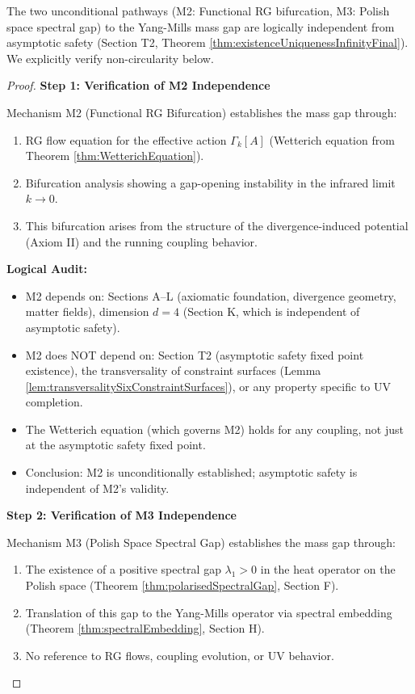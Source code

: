 \begin{lemma}
\label{lem:mechanismsIndependenceVerification}

The two unconditional pathways (M2: Functional RG bifurcation, M3: Polish space spectral gap) to the Yang-Mills mass gap are logically independent from asymptotic safety (Section T2, Theorem \ref{thm:existenceUniquenessInfinityFinal}). We explicitly verify non-circularity below.

\begin{proof}

\textbf{Step 1: Verification of M2 Independence}

Mechanism M2 (Functional RG Bifurcation) establishes the mass gap through:
\begin{enumerate}
\item RG flow equation for the effective action $\Gamma_k[A]$ (Wetterich equation from Theorem \ref{thm:WetterichEquation}).
\item Bifurcation analysis showing a gap-opening instability in the infrared limit $k \to 0$.
\item This bifurcation arises from the structure of the divergence-induced potential (Axiom II) and the running coupling behavior.
\end{enumerate}

\textbf{Logical Audit:}
\begin{itemize}
\item M2 depends on: Sections A--L (axiomatic foundation, divergence geometry, matter fields), dimension $d=4$ (Section K, which is independent of asymptotic safety).
\item M2 does NOT depend on: Section T2 (asymptotic safety fixed point existence), the transversality of constraint surfaces (Lemma \ref{lem:transversalitySixConstraintSurfaces}), or any property specific to UV completion.
\item The Wetterich equation (which governs M2) holds for any coupling, not just at the asymptotic safety fixed point.
\item Conclusion: M2 is unconditionally established; asymptotic safety is independent of M2's validity.
\end{itemize}

\textbf{Step 2: Verification of M3 Independence}

Mechanism M3 (Polish Space Spectral Gap) establishes the mass gap through:
\begin{enumerate}
\item The existence of a positive spectral gap $\lambda_1 > 0$ in the heat operator on the Polish space (Theorem \ref{thm:polarisedSpectralGap}, Section F).
\item Translation of this gap to the Yang-Mills operator via spectral embedding (Theorem \ref{thm:spectralEmbedding}, Section H).
\item No reference to RG flows, coupling evolution, or UV behavior.
\end{enumerate}


\end{proof}
\end{lemma}
